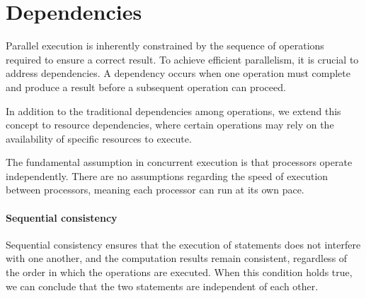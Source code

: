 \section{Dependencies}

Parallel execution is inherently constrained by the sequence of operations required to ensure a correct result. 
To achieve efficient parallelism, it is crucial to address dependencies. 
A dependency occurs when one operation must complete and produce a result before a subsequent operation can proceed.

In addition to the traditional dependencies among operations, we extend this concept to resource dependencies, where certain operations may rely on the availability of specific resources to execute.

The fundamental assumption in concurrent execution is that processors operate independently. 
There are no assumptions regarding the speed of execution between processors, meaning each processor can run at its own pace.

\paragraph*{Sequential consistency}
Sequential consistency ensures that the execution of statements does not interfere with one another, and the computation results remain consistent, regardless of the order in which the operations are executed.
When this condition holds true, we can conclude that the two statements are independent of each other. 


